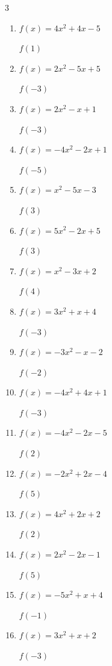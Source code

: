 \begin{multicols}{3}
\begin{enumerate}
  \item $f(x)=4x^{2}+4x-5$

$f(1)$
        \phantom{$= 3$}

\columnbreak %

  \item $f(x)=2x^{2}-5x+5$

$f(-3)$
        \phantom{$= 38$}

  \item $f(x)=2x^{2}-x+1$

$f(-3)$
        \phantom{$= 22$}

  \item $f(x)=-4x^{2}-2x+1$

$f(-5)$
        \phantom{$= -89$}

  \item $f(x)=x^{2}-5x-3$

$f(3)$
        \phantom{$= -9$}

  \item $f(x)=5x^{2}-2x+5$

$f(3)$
        \phantom{$= 44$}

  \item $f(x)=x^{2}-3x+2$

$f(4)$
        \phantom{$= 6$}

  \item $f(x)=3x^{2}+x+4$

$f(-3)$
        \phantom{$= 28$}

  \item $f(x)=-3x^{2}-x-2$

$f(-2)$
        \phantom{$= -12$}

  \item $f(x)=-4x^{2}+4x+1$

$f(-3)$
        \phantom{$= -47$}

  \item $f(x)=-4x^{2}-2x-5$

$f(2)$
        \phantom{$= -25$}

  \item $f(x)=-2x^{2}+2x-4$

$f(5)$
        \phantom{$= -44$}

  \item $f(x)=4x^{2}+2x+2$

$f(2)$
        \phantom{$= 22$}

  \item $f(x)=2x^{2}-2x-1$

$f(5)$
        \phantom{$= 39$}

  \item $f(x)=-5x^{2}+x+4$

$f(-1)$
        \phantom{$= -2$}

  \item $f(x)=3x^{2}+x+2$

$f(-3)$
        \phantom{$= 26$}

\end{enumerate}
\end{multicols}

